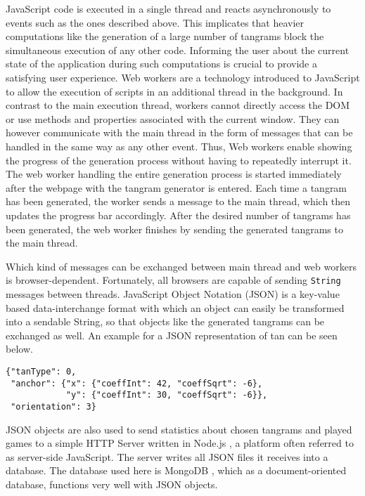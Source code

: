 JavaScript code is executed in a single thread and reacts asynchronously to events such as the ones described above. This implicates that heavier computations like the generation of a large number of tangrams block the simultaneous execution of any other code. Informing the user about the current state of the application during such computations is crucial to provide a satisfying user experience. Web workers \cite{w3c12} are a technology introduced to JavaScript to allow the execution of scripts in an additional thread in the background. In contrast to the main execution thread, workers cannot directly access the DOM or use methods and properties associated with the current window. They can however communicate with the main thread in the form of messages that can be handled in the same way as any other event. Thus, Web workers enable showing the progress of the generation process without having to repeatedly interrupt it. The web worker handling the entire generation process is started immediately after the webpage with the tangram generator is entered. Each time a tangram has been generated, the worker sends a message to the main thread, which then updates the progress bar accordingly. After the desired number of tangrams has been generated, the web worker finishes by sending the generated tangrams to the main thread. 

Which kind of messages can be exchanged between main thread and web workers is browser-dependent. Fortunately, all browsers are capable of sending \verb|String| messages between threads. JavaScript Object Notation (JSON) is a key-value based data-interchange format with which an object can easily be transformed into a sendable String, so that objects like the generated tangrams can be exchanged as well. An example for a JSON representation of tan can be seen below.

\begin{lstlisting}
{"tanType": 0,
 "anchor": {"x": {"coeffInt": 42, "coeffSqrt": -6}, 
            "y": {"coeffInt": 30, "coeffSqrt": -6}},
 "orientation": 3}
\end{lstlisting}

JSON objects are also used to send statistics about chosen tangrams and played games to a simple HTTP Server written in Node.js \cite{node}, a platform often referred to as server-side JavaScript. The server writes all JSON files it receives into a database. The database used here is MongoDB \cite{mongo}, which as a document-oriented database, functions very well with JSON objects.
